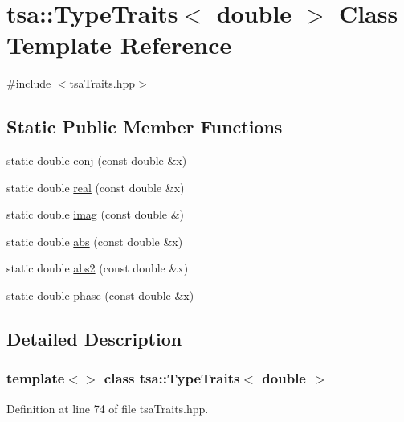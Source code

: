 \hypertarget{classtsa_1_1_type_traits_3_01double_01_4}{}\section{tsa\+:\+:Type\+Traits$<$ double $>$ Class Template Reference}
\label{classtsa_1_1_type_traits_3_01double_01_4}


{\ttfamily \#include $<$tsa\+Traits.\+hpp$>$}

\subsection*{Static Public Member Functions}
\begin{DoxyCompactItemize}
\item 
static double \hyperlink{classtsa_1_1_type_traits_3_01double_01_4_aafff3eab224af5ae3f4dea65aeb3f611}{conj} (const double \&x)
\item 
static double \hyperlink{classtsa_1_1_type_traits_3_01double_01_4_aacaf66bc787883b8cd043fa65a77ab2b}{real} (const double \&x)
\item 
static double \hyperlink{classtsa_1_1_type_traits_3_01double_01_4_a98ded872afb62012bd9595b1b032fb7e}{imag} (const double \&)
\item 
static double \hyperlink{classtsa_1_1_type_traits_3_01double_01_4_aa10a603ba4edcfcb09985d7c7bc2fb78}{abs} (const double \&x)
\item 
static double \hyperlink{classtsa_1_1_type_traits_3_01double_01_4_a4771ebd87b610400d5623f76dd58d7b3}{abs2} (const double \&x)
\item 
static double \hyperlink{classtsa_1_1_type_traits_3_01double_01_4_a6488c1cb2f330e72537a488589197df6}{phase} (const double \&x)
\end{DoxyCompactItemize}


\subsection{Detailed Description}
\subsubsection*{template$<$$>$\newline
class tsa\+::\+Type\+Traits$<$ double $>$}



Definition at line 74 of file tsa\+Traits.\+hpp.



